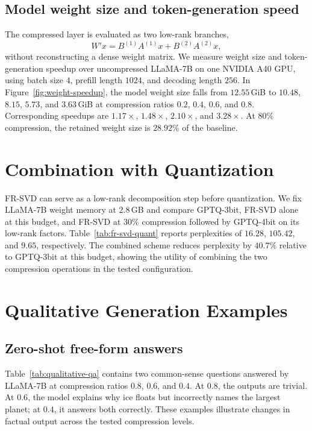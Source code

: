 

\subsection{Model weight size and token-generation speed}
The compressed layer is evaluated as two low-rank branches,
\begin{equation}
W'x=B^{(1)}A^{(1)}x+B^{(2)}A^{(2)}x,
\end{equation}
without reconstructing a dense weight matrix. We measure weight size and token-generation speedup over uncompressed LLaMA-7B on one NVIDIA A40 GPU, using batch size $4$, prefill length $1024$, and decoding length $256$. In Figure~\ref{fig:weight-speedup}, the model weight size falls from $12.55$\,GiB to $10.48$, $8.15$, $5.73$, and $3.63$\,GiB at compression ratios $0.2$, $0.4$, $0.6$, and $0.8$. Corresponding speedups are $1.17\times$, $1.48\times$, $2.10\times$, and $3.28\times$. At $80\%$ compression, the retained weight size is $28.92\%$ of the baseline.



\section{Combination with Quantization}\label{app:quantization}
FR-SVD can serve as a low-rank decomposition step before quantization. We fix LLaMA-7B weight memory at $2.8$\,GB and compare GPTQ-3bit, FR-SVD alone at this budget, and FR-SVD at $30\%$ compression followed by GPTQ-4bit on its low-rank factors. Table~\ref{tab:fr-svd-quant} reports perplexities of $16.28$, $105.42$, and $9.65$, respectively. The combined scheme reduces perplexity by $40.7\%$ relative to GPTQ-3bit at this budget, showing the utility of combining the two compression operations in the tested configuration.



\section{Qualitative Generation Examples}\label{app:qualitative}

\subsection{Zero-shot free-form answers}
Table~\ref{tab:qualitative-qa} contains two common-sense questions answered by LLaMA-7B at compression ratios $0.8$, $0.6$, and $0.4$. At $0.8$, the outputs are trivial. At $0.6$, the model explains why ice floats but incorrectly names the largest planet; at $0.4$, it answers both correctly. These examples illustrate changes in factual output across the tested compression levels.

